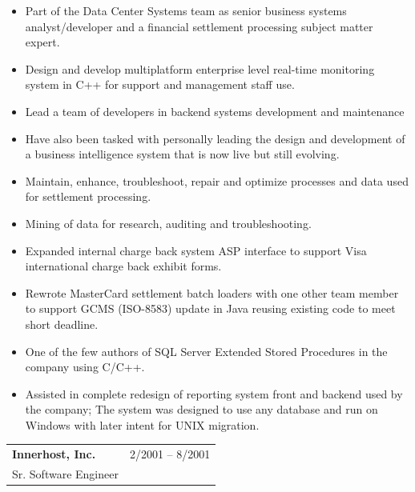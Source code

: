 \documentclass[10pt]{report}
\begin{document}
\begin{itemize}
\item Part of the Data Center Systems team as senior business systems analyst/developer and a financial settlement processing subject matter expert.  
\item Design and develop multiplatform enterprise level real-time monitoring system in C++ for support and management staff use. 
\item Lead a team of developers in backend systems development and maintenance
\item Have also been tasked with personally leading the design and development of a business intelligence system that is now live but still evolving.
\item Maintain, enhance, troubleshoot, repair and optimize processes and data used for settlement processing.
\item Mining of data for research, auditing and troubleshooting.
\item Expanded internal charge back system ASP interface to support Visa international charge back exhibit forms.
\item Rewrote MasterCard settlement batch loaders with one other team member to support GCMS (ISO-8583) update in Java reusing existing code to meet short deadline.
\item One of the few authors of SQL Server Extended Stored Procedures in the company using C/C++.

\item Assisted in complete redesign of reporting system front and backend used by the company; The system was designed to use any database and run on Windows with later intent for UNIX migration.
\end{itemize}
\bigskip

\pagebreak

\noindent
\begin{tabular}{ L{.5\textwidth}  R{.4\textwidth} }
\textbf{\large Innerhost, Inc.} & 2/2001 -- 8/2001 \\
Sr. Software Engineer
\end{tabular}
\end{document}
